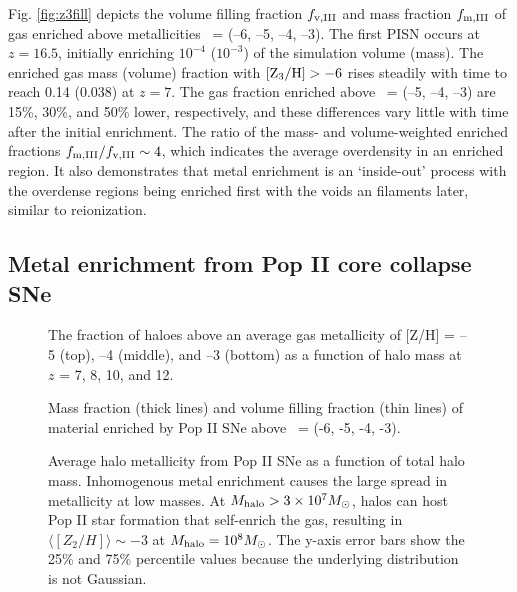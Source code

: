 \documentclass[useAMS,usenatbib]{mn2e}
\begin{document}
Fig. \ref{fig:z3fill} depicts the volume filling fraction $f_{\rm
  v,III}$ and mass fraction $f_{\rm m,III}$ of gas enriched above
metallicities \zthree~= (--6, --5, --4, --3).  The first PISN occurs
at $z = 16.5$, initially enriching $10^{-4}$ ($10^{-3}$) of the
simulation volume (mass).  The enriched gas mass (volume) fraction
with $\zthree > -6$ rises steadily with time to reach 0.14 (0.038) at
$z=7$.  The gas fraction enriched above \zthree~= (--5, --4, --3) are
15\%, 30\%, and 50\% lower, respectively, and these differences vary
little with time after the initial enrichment.  The ratio of the mass-
and volume-weighted enriched fractions $f_{\rm m,III}/f_{\rm v,III}
\sim 4$, which indicates the average overdensity in an enriched
region.  It also demonstrates that metal enrichment is an `inside-out'
process with the overdense regions being enriched first with the voids
an filaments later, similar to reionization.

\subsection{Metal enrichment from Pop II core collapse SNe}

\begin{figure}
  \caption{\label{fig:ztot} The fraction of haloes above an average
    gas metallicity of [Z/H] = --5 (top), --4 (middle), and --3
    (bottom) as a function of halo mass at $z$ = 7, 8, 10, and 12.}
\end{figure}

\begin{figure}
  \caption{\label{fig:z2fill} Mass fraction (thick lines) and volume
    filling fraction (thin lines) of material enriched by Pop II SNe
    above \ztwo~= (-6, -5, -4, -3).}
\end{figure}

\begin{figure}
  \caption{\label{fig:zhalo2} Average halo metallicity from Pop II SNe
    as a function of total halo mass.  Inhomogenous metal enrichment
    causes the large spread in metallicity at low masses.  At $M_{\rm
      halo} > 3 \times 10^7 \Ms$, halos can host Pop II star formation
    that self-enrich the gas, resulting in $\langle[Z_2/H]\rangle \sim
    -3$ at $M_{\rm halo} = 10^8 \Ms$.  The y-axis error bars show the
    25\% and 75\% percentile values because the underlying
    distribution is not Gaussian.}
\end{figure}
\end{document}

